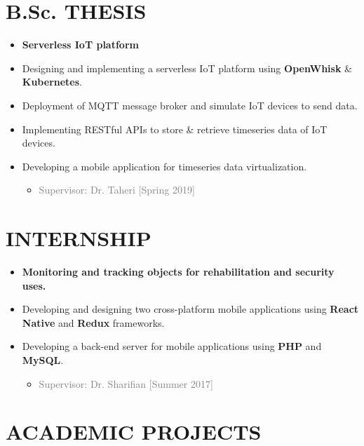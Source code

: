 \documentclass[10pt,a4paper,sans]{moderncv} %
\begin{document}
\section{B.Sc. THESIS}
\begin{itemize}
	\item \textbf{Serverless IoT platform}
	\item Designing and implementing a serverless IoT platform using \textbf{OpenWhisk} \& \textbf{Kubernetes}.
	\item Deployment of MQTT message broker and simulate IoT devices to send data.
	\item Implementing RESTful APIs to store \& retrieve timeseries data of IoT devices.
	\item Developing a mobile application for timeseries data virtualization.
	\begin{itemize} 
		\item\textcolor{gray}{Supervisor: Dr. Taheri [Spring 2019]} 
	\end{itemize}
\end{itemize}

\section{INTERNSHIP}
\begin{itemize}
	\item \textbf{Monitoring and tracking objects for rehabilitation and security uses.}
	\item Developing and designing two cross-platform mobile applications using \textbf{React Native} and \textbf{Redux} frameworks.
	\item Developing a back-end server for mobile applications using \textbf{PHP} and \textbf{MySQL}.
	\begin{itemize} 
		\item\textcolor{gray}{Supervisor: Dr. Sharifian [Summer 2017]} 
	\end{itemize}
\end{itemize}

\section{ACADEMIC PROJECTS}
\end{document}
